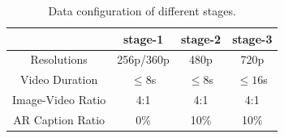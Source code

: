 \begin{table}
    \centering
    \small
    \begin{tabular}{c|c|c|c}
    \toprule
    & stage-1 & stage-2 & stage-3 \\
    \midrule
    Resolutions & 256p/360p & 480p & 720p\\
    Video Duration & $\leq8$s & $\leq8$s & $\leq16$s \\
    Image-Video Ratio & 4:1 & 4:1 & 4:1 \\
    AR Caption Ratio & 0\% & 10\% & 10\% \\
    \bottomrule
    \end{tabular}
    \vspace{0.5em}
    \caption{Data configuration of different stages.}
    \label{table:data_configuration}
\end{table}
